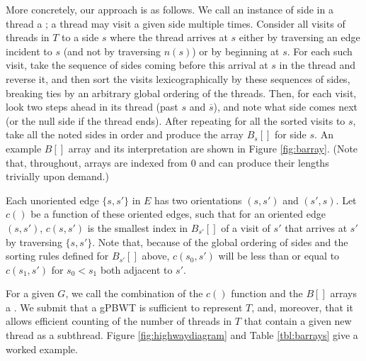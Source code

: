 More concretely, our approach is as follows. We call an instance of side in a thread a ; a thread may visit a given side multiple times. Consider all visits of threads in $T$ to a side $s$ where the thread arrives at $s$ either by traversing an edge incident to $s$ (and not by traversing $n(s)$) or by beginning at $s$. For each such visit, take the sequence of sides coming before this arrival at $s$ in the thread and reverse it, and then sort the visits lexicographically by these sequences of sides, breaking ties by an arbitrary global ordering of the threads. Then, for each visit, look two steps ahead in its thread (past $s$ and $\overline{s}$), and note what side comes next (or the null side if the thread ends). After repeating for all the sorted visits to $s$, take all the noted sides in order and produce the array $B_s[]$ for side $s$. An example $B[]$ array and its interpretation are shown in Figure \ref{fig:barray}. (Note that, throughout, arrays are indexed from $0$ and can produce their lengths trivially upon demand.)  

Each unoriented edge $\{ s, s' \}$ in $E$ has two orientations $(s, s')$ and $(s', s)$. Let $c()$ be a function of these oriented edges, such that for an oriented edge $( s, s' )$, $c(s, s')$ is the smallest index in $B_{s'}[]$ of a visit of $s'$ that arrives at $s'$ by traversing $\{ s, s' \}$. Note that, because of the global ordering of sides and the sorting rules defined for $B_{s'}[]$ above, $c(s_0, s')$ will be less than or equal to $c(s_1, s')$ for $s_0 < s_1$ both adjacent to $s'$.


For a given $G$, we call the combination of the $c()$ function and the $B[]$ arrays a . We submit that a gPBWT is sufficient to represent $T$, and, moreover, that it allows efficient counting of the number of threads in $T$ that contain a given new thread as a subthread. Figure \ref{fig:highwaydiagram} and Table \ref{tbl:barrays} give a worked example.



